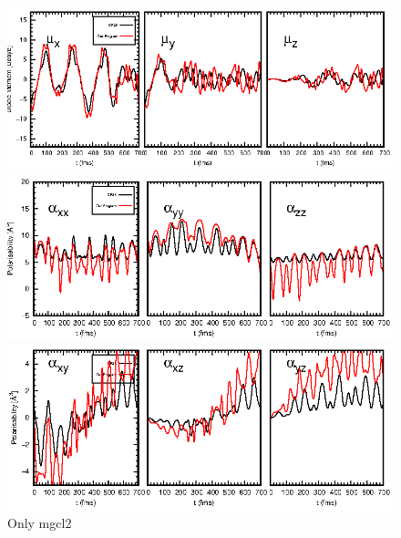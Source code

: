\documentclass{article}
\begin{document}
\begin{figure}
	\centering
	\includegraphics[width=6.2in]{mgcl2/Fig1.eps}
	
	\includegraphics[width=6.2in]{mgcl2/Fig2.eps}
	
	\includegraphics[width=6.2in]{mgcl2/Fig3.eps}
	\caption{Only mgcl2}
\end{figure}
\end{document}

